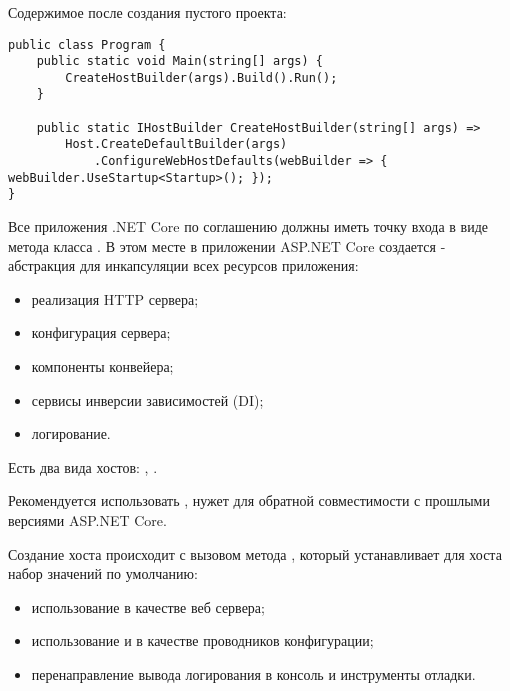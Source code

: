 \documentclass[a4paper,14pt]{extarticle}
\begin{document}
\subsubsection{}

Содержимое  после создания пустого проекта:

\begin{lstlisting}
public class Program {
    public static void Main(string[] args) {
        CreateHostBuilder(args).Build().Run();
    }

    public static IHostBuilder CreateHostBuilder(string[] args) =>
        Host.CreateDefaultBuilder(args)
            .ConfigureWebHostDefaults(webBuilder => { webBuilder.UseStartup<Startup>(); });
}
\end{lstlisting}

Все приложения .NET Core по соглашению должны иметь точку входа в виде метода
 класса . В этом месте в приложении ASP.NET Core
создается  - абстракция для инкапсуляции всех ресурсов приложения:

\begin{itemize}
    \item реализация HTTP сервера;
    \item конфигурация сервера;
    \item компоненты конвейера;
    \item сервисы инверсии зависимостей (DI);
    \item логирование.
\end{itemize}

Есть два вида хостов: , .

Рекомендуется использовать ,  нужет для обратной совместимости с прошлыми версиями ASP.NET Core.

Создание хоста происходит с вызовом метода , который
устанавливает для хоста набор значений по умолчанию:

\begin{itemize}
    \item использование  в качестве веб сервера;
    \item использование  и
          в качестве проводников конфигурации;
    \item перенаправление вывода логирования в консоль и инструменты отладки.
\end{itemize}
\end{document}
